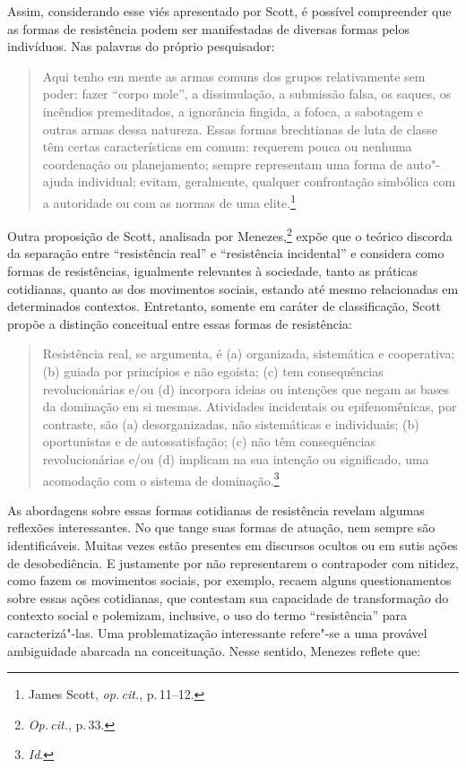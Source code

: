 Assim, considerando esse viés apresentado por Scott, é possível
compreender que as formas de resistência podem ser manifestadas de
diversas formas pelos indivíduos. Nas palavras do próprio pesquisador:

\begin{quote}
Aqui tenho em mente as armas comuns dos grupos relativamente sem poder:
fazer ``corpo mole'', a dissimulação, a submissão falsa, os saques, os
incêndios premeditados, a ignorância fingida, a fofoca, a sabotagem e
outras armas dessa natureza. Essas formas brechtianas de luta de classe
têm certas características em comum: requerem pouca ou nenhuma
coordenação ou planejamento; sempre representam uma forma de auto"-ajuda
individual; evitam, geralmente, qualquer confrontação simbólica com a
autoridade ou com as normas de uma elite.\footnote{James Scott, \textit{op.\,cit.}, p.\,11--12.}
\end{quote}

Outra proposição de Scott, analisada por Menezes,\footnote{\textit{Op.\,cit.}, p.\,33.} expõe que o
teórico discorda da separação entre ``resistência real'' e ``resistência
incidental'' e considera como formas de resistências, igualmente
relevantes à sociedade, tanto as práticas cotidianas, quanto as dos
movimentos sociais, estando até mesmo relacionadas em determinados
contextos. Entretanto, somente em caráter de classificação, Scott propõe a distinção conceitual entre essas
formas de resistência:

\begin{quote}
Resistência real, se argumenta, é (a) organizada, sistemática e
cooperativa; (b) guiada por princípios e não egoísta; (c) tem
consequências revolucionárias e/ou (d) incorpora ideias ou intenções
que negam as bases da dominação em si mesmas. Atividades incidentais ou
epifenomênicas, por contraste, são (a) desorganizadas, não sistemáticas
e individuais; (b) oportunistas e de autossatisfação; (c) não têm
consequências revolucionárias e/ou (d) implicam na sua intenção ou
significado, uma acomodação com o sistema de dominação.\footnote{\textit{Id}.}
\end{quote}

As abordagens sobre essas formas cotidianas de resistência revelam
algumas reflexões interessantes. No que tange suas formas de atuação,
nem sempre são identificáveis. Muitas vezes estão presentes em discursos
ocultos ou em sutis ações de desobediência. E justamente por não
representarem o contrapoder com nitidez, como fazem os movimentos
sociais, por exemplo, recaem alguns questionamentos sobre essas ações
cotidianas, que contestam sua capacidade de transformação do contexto
social e polemizam, inclusive, o uso do termo ``resistência'' para
caracterizá"-las. Uma problematização interessante refere"-se a uma
provável ambiguidade abarcada na conceituação. Nesse sentido, Menezes
reflete que:

